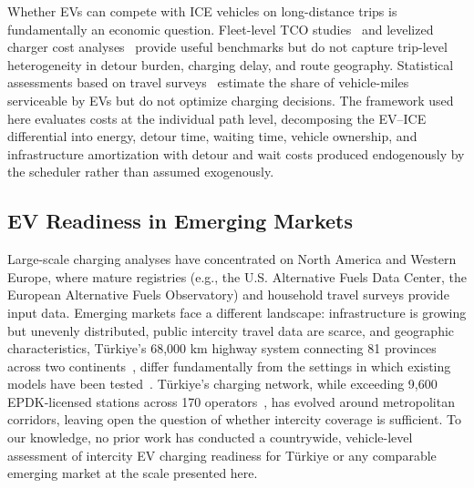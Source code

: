 Whether EVs can compete with ICE vehicles on long-distance trips is fundamentally an economic question. Fleet-level TCO studies~\cite{hagman_2016} and levelized charger cost analyses~\cite{ledna_2022} provide useful benchmarks but do not capture trip-level heterogeneity in detour burden, charging delay, and route geography. Statistical assessments based on travel surveys~\cite{needell_2016,chakraborty_2019} estimate the share of vehicle-miles serviceable by EVs but do not optimize charging decisions. The framework used here evaluates costs at the individual path level, decomposing the EV--ICE differential into energy, detour time, waiting time, vehicle ownership, and infrastructure amortization with detour and wait costs produced endogenously by the scheduler rather than assumed exogenously.

\subsection{EV Readiness in Emerging Markets}

Large-scale charging analyses have concentrated on North America and Western Europe, where mature registries (e.g., the U.S. Alternative Fuels Data Center, the European Alternative Fuels Observatory) and household travel surveys provide input data. Emerging markets face a different landscape: infrastructure is growing but unevenly distributed, public intercity travel data are scarce, and geographic characteristics, T\"{u}rkiye's 68,000 km highway system connecting 81 provinces across two continents~\cite{kgm_traffic_2024}, differ fundamentally from the settings in which existing models have been tested~\cite{iea_2024}. T\"{u}rkiye's charging network, while exceeding 9,600 EPDK-licensed stations across 170 operators~\cite{sarjgezgini_2025}, has evolved around metropolitan corridors, leaving open the question of whether intercity coverage is sufficient. To our knowledge, no prior work has conducted a countrywide, vehicle-level assessment of intercity EV charging readiness for T\"{u}rkiye or any comparable emerging market at the scale presented here.

